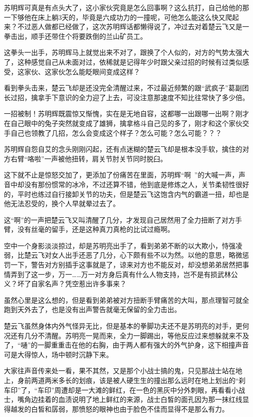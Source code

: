苏明辉可真是有点头大了，这小家伙究竟是怎么回事啊？这么抗打，自己给他的那一下够他在床上躺3天的，毕竟是六成功力的一撞呢，可他怎么能这么快又爬起来？不过恶人做都已经做了，这次苏明辉话都懒得说了，冲过去对着楚云飞又是一拳击出，顺手还带住个将要跌倒的兰山矿员工。

这拳头一出手，苏明辉马上就觉出来不对了，跟换了个人似的，对方的气势太强大了，这种感觉自己从未面对过，依稀就是记得年少时跟父亲过招的时候有过类似感受，这家伙、这家伙怎么能眨眼间变成这样？

看到拳头击来，楚云飞却是还没完全清醒过来，不过最近频繁的跟“武疯子”葛副团长过招，擒拿手下意识的全力迎了上去，可没注意那速度不知比往常快了多少倍。

一招被制！苏明辉既震惊又惭愧，实在是无地自容，这都哪一出跟哪一出啊？刚才在自己眼中的兔子突然就变成了雄狮，擒拿格斗自己见的多了，刚才和这个家伙交手自己也领教了几招，怎么会变成这个样子？怎么可能？怎么可能？？？

苏明辉自怨自艾的念头刚刚闪起，还有点迷糊的楚云飞却是根本没手软，擒住的对方右臂“咯啦”一声被他扭转，肩关节肘关节同时脱臼。

这下就不止是惊怒交加了，更添加了份痛苦在里面，苏明辉“啊~”的大喊一声，声音中却没有那份惯常的冰冷，不过还算不错，他到底是修炼之人，关节柔韧性很好的，平时也练过自行接卸关节的功夫，但是楚云飞这饱含内气的霸道一扭，却也是他无法忍受的，换个人早就晕过去了。

这“啊”的一声把楚云飞又叫清醒了几分，才发现自己居然用了全力扭断了对方手臂，没有丝毫的留手，还是这种真刀真枪的比试过瘾啊。

空中一个身影淡淡掠过，却是苏明亮出手了，看到弟弟不断的以大欺小，恃强凌弱，比楚云飞对女人出手还恶了几分，心下颇有些不以为然。以他的意思，略微惩罚一下，警告对方别插手这事就是了，谅来对方也不能反对，却没想弟弟居然把事情弄到了这一步，万一……万一对方身后真有什么人物支持，岂不是有损武林公义？坏了自家名声？凭空惹出许多事来？

虽然心里是这么想的，但是看到弟弟被对方扭断手臂痛苦的大叫，那点理智可就全跑到天外去了，也是没有出声警告就毫无保留的全力击出。

楚云飞虽然身体内外气怪异无比，但是基本的拳脚功夫还不是苏明亮的对手，更何况还有几分不清醒。苏明亮一晃而来，全力一脚踢出，等他反应过来想躲就来不及了，“嗵”的一脚重重击在他的右胸，由于两人都有强大的外气护身，这下相撞声音可是大得惊人，场中顿时沉静下来。

大家往声音传来处一看，果不其然，又是那个小战士搞的鬼，只见那战士站在地上，身前两道两米多长的划痕，该是被人硬生生的撞出那么远时在地上划出的“刹车印”了，“车印”周遭却是一大滩的鲜红，在一色的黑灰中分外刺眼，再看看小战士，嘴角边挂着的血渍说明了地上鲜红的来源，战士白皙的面孔因为那一抹红线显得越发的白皙和孱弱，那愤怒的眼神也由于脸色不佳而显得不是那么有力。

